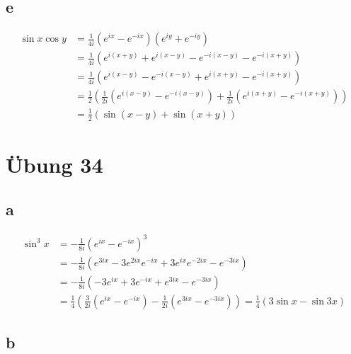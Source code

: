 \documentclass[a4paper,10pt]{article}
\begin{document}
\subsection*{e}

\begin{align*}
 \sin x \cos y & = \frac{1}{4i}(e^{ix} - e^{-ix})(e^{iy} + e^{-iy})\\
 & = \frac{1}{4i}(e^{i(x + y)} + e^{i(x - y)} - e^{-i(x - y)} - e^{-i(x + y)})\\
 & = \frac{1}{4i}(e^{i(x - y)} - e^{-i(x - y)} + e^{i(x + y)} - e^{-i(x + y)})\\
 & = \frac{1}{2}(\frac{1}{2i}(e^{i(x - y)} - e^{-i(x - y)}) + \frac{1}{2i}(e^{i(x + y)} - e^{-i(x + y)}))\\
 & = \frac{1}{2}(\sin(x - y) + \sin(x + y))
\end{align*}

\section*{Übung 34}

\subsection*{a}

\begin{align*}
 \sin^3 x & = -\frac{1}{8i}(e^{ix} - e^{-ix})^3\\
 & = -\frac{1}{8i}(e^{3ix} - 3e^{2ix}e^{-ix} + 3e^{ix}e^{-2ix} - e^{-3ix})\\
 & = -\frac{1}{8i}(-3e^{ix} + 3e^{-ix} + e^{3ix} - e^{-3ix})\\
 & = \frac{1}{4}(\frac{3}{2i}(e^{ix} - e^{-ix}) - \frac{1}{2i}(e^{3ix} - e^{-3ix})) = \frac{1}{4}(3\sin x - \sin 3x)
\end{align*}

\subsection*{b}
\end{document}
